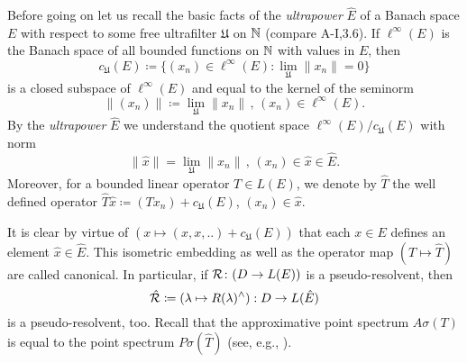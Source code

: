 Before going on let us recall the basic facts of the \emph{ultrapower} $\hat{E}$ of a Banach space $E$ with respect to some free ultrafilter $\mathfrak{U}$ on $\mathbb{N} $ (compare A-I,3.6).
If $\ell^{\infty}(E)$ is the Banach space of all bounded functions on $\mathbb{N} $ with values in $E$, then
\[
c_{\mathfrak{U}}(E) \coloneqq \{(x_{n}) \in \ell^{\infty}(E) \colon \lim_{\mathfrak{U}}\|x_{n}\| = 0\}
\]
is a closed subspace of $\ell^{\infty}(E)$ and equal to the kernel of the seminorm
\[
\|(x_{n})\| \coloneqq \lim_{\mathfrak{U}}\|x_{n}\| \, , \, (x_{n}) \in \ell^{\infty}(E).
\]
By the \emph{ultrapower} $\hat{E}$ we understand the quotient space $\ell^{\infty}(E)/c_{\mathfrak{U}}(E)$ with norm
\[
\|\hat{x}\| = \lim_{\mathfrak{U}}\|x_{n}\| \, , \, (x_{n}) \in \hat{x} \in \hat{E}.
\]
Moreover, for a bounded linear operator $T \in L(E)$, we denote by $\hat{T}$ the well defined operator $\hat{T}\hat{x} \coloneqq (Tx_{n}) + c_{\mathfrak{U}}(E)$, $(x_{n}) \in \hat{x}$.

It is clear by virtue of $(x \mapsto (x, x, ..) + c_{\mathfrak{U}}(E))$ that each $x \in E$ defines an element $\hat{x} \in \hat{E}$.
This isometric embedding as well as the operator map $(T \mapsto \hat{T})$ are called canonical.
In particular, if $\mathcal{R} \colon (D \to L(E))$ is a pseudo-resolvent, then
\[
\hat{\mathcal{R}} \coloneqq (\lambda \mapsto R(\lambda)^{\wedge}): D \to L(\hat{E})
\]
is a pseudo-resolvent, too.
Recall that the approximative point spectrum $A{\sigma}(T)$ is equal to the point spectrum $P{\sigma}(\hat{T})$ (see, e.g., \citet[Chapter V, §1]{schaefer:1974}).

